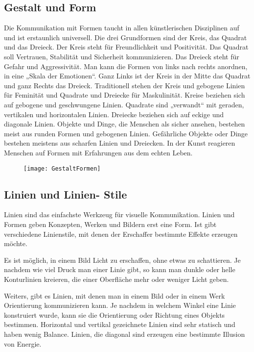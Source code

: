 \subsection{Gestalt und Form}
Die Kommunikation mit Formen taucht in allen künstlerischen Disziplinen auf und ist erstaunlich universell. Die drei Grundformen sind der Kreis, das Quadrat und das Dreieck. Der Kreis steht für Freundlichkeit und Positivität. Das Quadrat soll Vertrauen, Stabilität und Sicherheit kommunizieren. Das Dreieck steht für Gefahr und Aggressivität. Man kann die Formen von links nach rechts anordnen, in eine „Skala der Emotionen“. Ganz Links ist der Kreis in der Mitte das Quadrat und ganz Rechts das Dreieck. Traditionell stehen der Kreis und gebogene Linien für Feminität und Quadrate und Dreiecke für Maskulinität.
Kreise beziehen sich auf gebogene und geschwungene Linien. Quadrate sind „verwandt“ mit geraden, vertikalen und horizontalen Linien. Dreiecke beziehen sich auf eckige und diagonale Linien. 
Objekte und Dinge, die Menschen als sicher ansehen, bestehen meist aus runden Formen und gebogenen Linien. Gefährliche Objekte oder Dinge bestehen meistens aus scharfen Linien und Dreiecken. In der Kunst reagieren Menschen auf Formen mit Erfahrungen aus dem echten Leben.
\cite{solarski2012drawing}

\begin{figure}[H]
	\centering
	\texttt{[image: GestaltFormen]}
	\caption{\cite{solarski2012drawing}}
\end{figure}

\subsection{Linien und Linien- Stile}
Linien sind das einfachste Werkzeug für visuelle Kommunikation. Linien und Formen geben Konzepten, Werken und Bildern erst eine Form. Ist gibt verschiedene Linienstile, mit denen der Erschaffer bestimmte Effekte erzeugen möchte. 

Es ist möglich, in einem Bild Licht zu erschaffen, ohne etwas zu schattieren. Je nachdem wie viel Druck man einer Linie gibt, so kann man dunkle oder helle Konturlinien kreieren, die einer Oberfläche mehr oder weniger Licht geben. 

Weiters, gibt es Linien, mit denen man in einem Bild oder in einem Werk Orientierung kommunizieren kann. Je nachdem in welchem Winkel eine Linie konstruiert wurde, kann sie die Orientierung oder Richtung eines Objekts bestimmen. Horizontal und vertikal gezeichnete Linien sind sehr statisch und haben wenig Balance. Linien, die diagonal sind erzeugen eine bestimmte Illusion von Energie.

